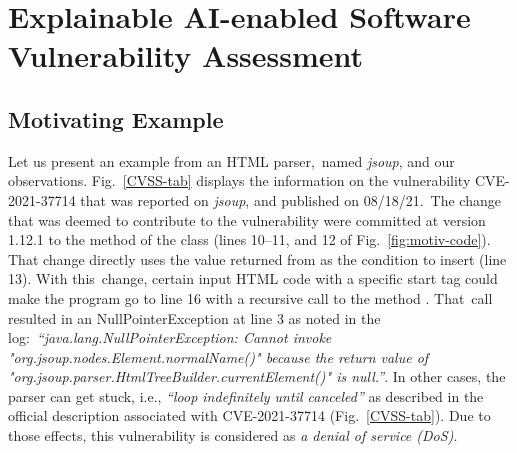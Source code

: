 \section{Explainable AI-enabled Software Vulnerability Assessment}
\label{sec:thrust2}

\subsection{Motivating Example}
\label{exe:sec}






Let us present an example from an HTML parser,~named {\em
  jsoup}, and our observations.
Fig.~\ref{CVSS-tab} displays the information on the vulnerability
CVE-2021-37714 that was reported on {\em jsoup}, and published on
08/18/21.~The change that was deemed to contribute to the
vulnerability were committed at version 1.12.1 to the method
 of the
 class (lines 10--11, and 12 of
Fig.~\ref{fig:motiv-code}). That change directly uses the value
returned from  as the condition to
insert  (line 13). With this~change, certain input HTML
code with a specific start tag could make the program go to line 16
with a recursive call to the method . That~call
resulted in an NullPointerException at line 3 as noted in the
log:~{\em ``java.\-lang.\-Null\-Pointer\-Ex\-ception: Cannot invoke
  "org.\-jsoup.\-nodes.\-Element.\-normalName()" because the return
  value of
  "org.\-jsoup.\-parser.\-HtmlTree\-Builder.\-current\-Element()" is
  null.''}. In other cases, the parser can get stuck, i.e., {\em
  ``loop indefinitely until canceled''} as described in the official
description associated with CVE-2021-37714 (Fig.~\ref{CVSS-tab}). Due
to those effects, this vulnerability is considered as {\em a denial of
  service (DoS)}.

